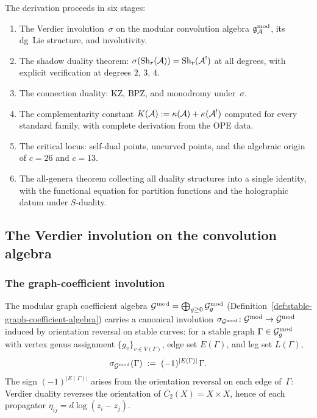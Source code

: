 The derivation proceeds in six stages:
\begin{enumerate}[label=\textup{(\Roman*)}]
\item The Verdier involution~$\sigma$ on the modular convolution algebra
 $\mathfrak{g}_{\mathcal{A}}^{\mathrm{mod}}$, its dg~Lie structure, and involutivity.
\item The shadow duality theorem: $\sigma(\mathrm{Sh}_r(\mathcal{A})) = \mathrm{Sh}_r(\mathcal{A}^!)$
 at all degrees, with explicit verification at degrees $2$, $3$, $4$.
\item The connection duality: KZ, BPZ, and monodromy under~$\sigma$.
\item The complementarity constant
 $K(\mathcal{A}) := \kappa(\mathcal{A}) + \kappa(\mathcal{A}^!)$ computed for every
 standard family, with complete derivation from the OPE data.
\item The critical locus: self-dual points, uncurved points,
 and the algebraic origin of $c = 26$ and $c = 13$.
\item The all-genera theorem collecting all duality structures into
 a single identity, with the functional equation for partition
 functions and the holographic datum under $S$-duality.
\end{enumerate}

%
%

\subsection{The Verdier involution on the convolution algebra}
\label{subsec:thqg-IV-verdier-convolution}

\subsubsection{The graph-coefficient involution}

\begin{definition}
\label{def:thqg-IV-verdier-modular}
The modular graph coefficient algebra
$\mathcal{G}^{\mathrm{mod}} = \bigoplus_{g \geq 0} \mathcal{G}^{\mathrm{mod}}_g$
(Definition~\ref{def:stable-graph-coefficient-algebra})
carries a canonical involution
$\sigma_{\mathcal{G}^{\mathrm{mod}}}\colon \mathcal{G}^{\mathrm{mod}} \to \mathcal{G}^{\mathrm{mod}}$
induced by orientation reversal on stable curves:
for a stable graph $\Gamma \in \mathcal{G}^{\mathrm{mod}}_g$ with vertex genus assignment
$\{g_v\}_{v \in V(\Gamma)}$, edge set $E(\Gamma)$, and leg set
$L(\Gamma)$,
\begin{equation}\label{eq:thqg-IV-graph-involution}
\sigma_{\mathcal{G}^{\mathrm{mod}}}(\Gamma)
\;:=\;
(-1)^{|E(\Gamma)|}\,\Gamma.
\end{equation}
The sign $(-1)^{|E(\Gamma)|}$ arises from the orientation reversal on
each edge of~$\Gamma$: Verdier duality reverses the orientation of
$\overline{C}_2(X) = X \times X$, hence of each propagator
$\eta_{ij} = d\log(z_i - z_j)$.
\end{definition}

